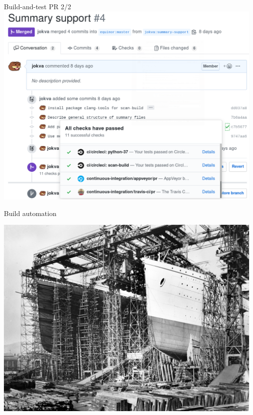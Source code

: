 \documentclass[pdf]{beamer}
\begin{document}
\begin{frame}{Build-and-test PR 2/2}
    \includegraphics[width = \textwidth]{github-checks-passed.png}
\end{frame}

\begin{frame}{Build automation}
    \begin{center}
    \includegraphics[keepaspectratio, height = 0.8\textheight]{olympic-titanic.jpg}
    \end{center}
\end{frame}
\end{document}
